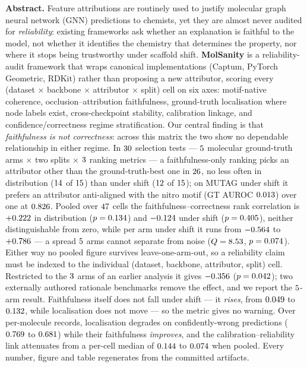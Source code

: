 \small
\textbf{Abstract.}
Feature attributions are routinely used to justify molecular graph neural
network (GNN) predictions to chemists, yet they are almost never audited for
\emph{reliability}: existing frameworks ask whether an explanation is faithful
to the model, not whether it identifies the chemistry that determines the
property, nor where it stops being trustworthy under scaffold shift.
\textbf{MolSanity} is a reliability-audit framework that wraps canonical
implementations (Captum, PyTorch Geometric, RDKit) rather than proposing a new
attributor, scoring every (dataset × backbone × attributor × split) cell on six
axes: motif-native coherence, occlusion--attribution faithfulness, ground-truth
localisation where node labels exist, cross-checkpoint stability, calibration
linkage, and confidence/correctness regime stratification.
Our central finding is that \emph{faithfulness is not correctness}: across
this matrix the two show no dependable relationship in either regime. In
$30{}$ selection tests --- $5{}$ molecular ground-truth arms
$\times$ two splits $\times$ $3{}$ ranking metrics --- a
faithfulness-only ranking picks an attributor other than the ground-truth-best
one in $26{}$, no less often in distribution
($14{}$ of $15{}$) than under shift
($12{}$ of $15{}$); on MUTAG under shift it
prefers an attributor anti-aligned with the nitro motif (GT AUROC
$0.013{}$) over one at $0.826{}$. Pooled over
$47{}$ cells the
faithfulness--correctness rank correlation is $+0.222{}$ in
distribution ($p=0.134{}$) and $-0.124{}$ under shift
($p=0.405{}$), neither distinguishable from zero, while per arm under
shift it runs from $-0.564{}$ to $+0.786{}$ --- a spread
$5{}$ arms cannot separate from noise ($Q=8.53{}$,
$p=0.074{}$). Either way no pooled figure survives leave-one-arm-out, so
a reliability claim must be indexed to the individual (dataset, backbone,
attributor, split) cell. Restricted to the $3{}$ arms of an
earlier analysis it gives $-0.356{}$
($p=0.042{}$); two externally authored rationale benchmarks remove
the effect, and we report the $5{}$-arm result.
Faithfulness itself does not fall under shift --- it \emph{rises}, from
$0.049{}$ to $0.132{}$, while localisation
does not move --- so the metric gives no warning. Over \nRecords{}
per-molecule records, localisation degrades on confidently-wrong predictions
($0.769{}$ to $0.681{}$) while their faithfulness
\emph{improves}, and the calibration--reliability link attenuates from a
per-cell median of $0.144{}$ to $0.074{}$ when pooled. Every
number, figure and table regenerates from the committed artifacts.
